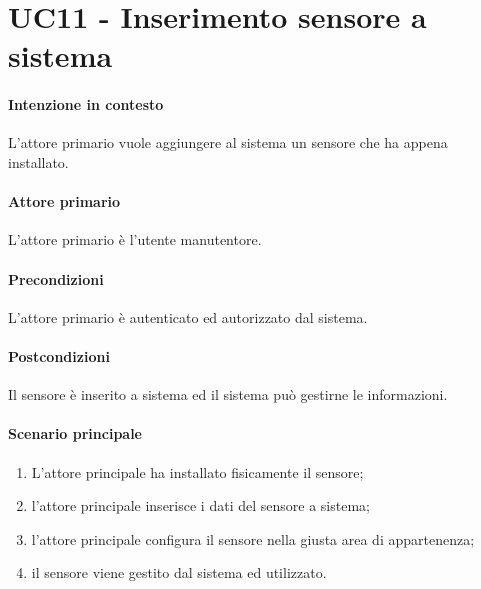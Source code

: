 \section{UC11 - Inserimento sensore a sistema}\label{uc:11}

\paragraph{Intenzione in contesto} L'attore primario vuole aggiungere al sistema un sensore che ha appena installato.

\paragraph{Attore primario} L'attore primario è l'utente manutentore.

\paragraph{Precondizioni} L'attore primario è autenticato ed autorizzato dal sistema.

\paragraph{Postcondizioni} Il sensore è inserito a sistema ed il sistema può gestirne le informazioni.

\paragraph{Scenario principale}

\begin{enumerate}
    \item L'attore principale ha installato fisicamente il sensore;
    \item l'attore principale inserisce i dati del sensore a sistema;
    \item l'attore principale configura il sensore nella giusta area di appartenenza;
    \item il sensore viene gestito dal sistema ed utilizzato.
\end{enumerate}
